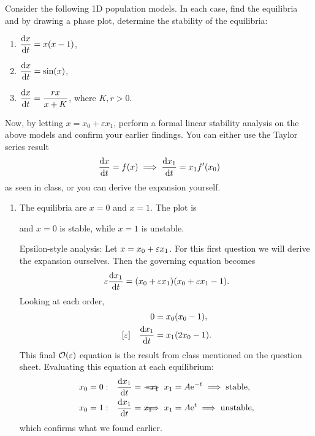 \documentclass[a4paper, 12pt]{article}
\begin{document}
\begin{enumerate}[label={\bf \arabic{*}.\;}, ref={\arabic{*}},itemsep=3ex, left=0ex]

    {
      Consider the following 1D population models. In each case, find the equilibria and by drawing a phase plot, determine the stability of the equilibria:
      \begin{enumerate}[label=(\alph{*})]
        \item $\displaystyle \fd{x}{t}= x(x-1)$,
        \item $\displaystyle \fd{x}{t}= \sin(x)$,
        \item $\displaystyle \fd{x}{t}= \frac{r x}{x+K}$, where $K,r>0$.
      \end{enumerate}
      Now, by letting $x=x_{0}+\varepsilon x_{1}$, perform a formal linear stability analysis on the above models and confirm your earlier findings. You can either use the Taylor series result
      \begin{equation}
        \fd{x}{t}= f(x) \implies \fd{x_1}{t}= x_{1}f'(x_{0})
      \end{equation}
      as seen in class, or you can derive the expansion yourself.
    }
    {
      \begin{enumerate}[label=(\alph*)]
        \item The equilibria are $x=0$ and $x=1$. The plot is

          \begin{center}
            
          \end{center}

          and $x=0$ is stable, while $x=1$ is unstable.

          Epsilon-style analysis: Let $x=x_0+\varepsilon x_1$. For this first question we will derive the expansion ourselves. Then the governing equation becomes
          \begin{equation}
            \ep \fd{x_1}{t} = (x_0+\ep x_1)(x_0 + \ep x_1 - 1).
          \end{equation}
          Looking at each order,
          \begin{align}
            [1] && 0 &= x_0(x_0-1),\\
            [\ep] && \fd{x_1}{t} &= x_1(2x_0-1).
          \end{align}
          This final $\mathcal{O}(\varepsilon)$ equation is the result from class mentioned on the question sheet. Evaluating this equation at each equilibrium:
          \begin{align}
            x_0 = 0: && \fd{x_1}{t} & = -x_1 \hspace{-1cm} & \implies x_1 &=A\e^{-t} \implies \text{stable},\\
            x_0 = 1: && \fd{x_1}{t} & = x_1 \hspace{-1cm} & \implies x_1 &=A\e^{t} \implies \text{unstable},
          \end{align}
          which confirms what we found earlier.


\end{enumerate}}
\end{enumerate}
\end{document}
